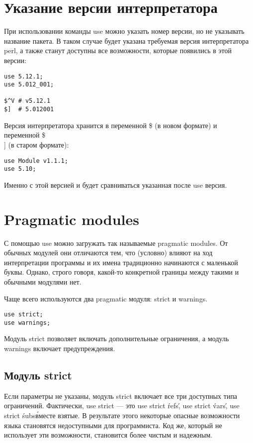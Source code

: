 \section{Указание версии интерпретатора}
При использовании команды use можно указать номер версии, но не указывать название пакета. В таком случае будет указана требуемая версия интерпретатора perl, а также станут доступны все возможности, которые появились в этой версии:
\begin{verbatim}
use 5.12.1;
use 5.012_001;

$^V # v5.12.1
$]  # 5.012001
\end{verbatim}
Версия интерпретатора хранится в переменной \$ (в новом формате) и переменной \$\\] (в старом формате):
\begin{verbatim}
use Module v1.1.1;
use 5.10;
\end{verbatim}
Именно с этой версией и будет сравниваться указанная после use версия.

\section{Pragmatic modules} %
С помощью use можно загружать так называемые pragmatic modules. От обычных модулей они отличаются тем, что (условно) влияют на ход интерпретации программы и их имена традиционно начинаются с маленькой буквы. Однако, строго говоря, какой-то конкретной границы между такими и обычными модулями нет.

Чаще всего используются два pragmatic модуля: strict и warnings.
\begin{verbatim}
use strict;
use warnings;
\end{verbatim}
Модуль strict позволяет включать дополнительные ограничения, а модуль warnings включает предупреждения.

\subsection{Модуль strict} %
Если параметры не указаны, модуль strict включает все три доступных типа ограничений. Фактически, use strict --- это use strict \'refs\', use strict \'vars\', use strict \'subs\' вместе взятые. В результате этого некоторые опасные возможности языка становятся недоступными для программиста. Код же, который не использует эти возможности, становится более чистым и надежным.

